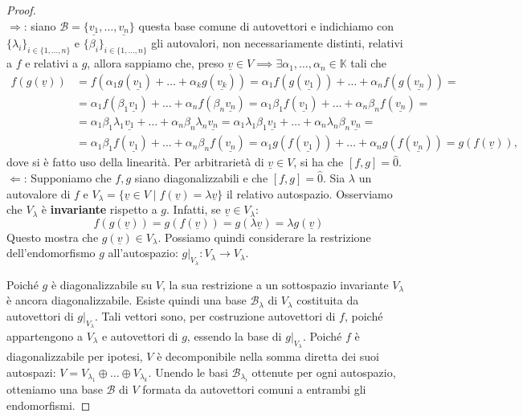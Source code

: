 \begin{proof} \hspace{1cm} \\
    $\boxed{\Rightarrow}$: siano $\mathcal{B} = \{ \underline{v_1}, \ldots, \underline{v_n} \}$ questa base comune di autovettori e indichiamo con $\{ \lambda_i \}_{i \in \{ 1, \ldots, n \}}$ e $\{ \beta_i \}_{i \in \{ 1, \ldots, n\}}$ gli autovalori, non necessariamente distinti, relativi a $f$ e relativi a $g$, allora sappiamo che, preso $\underline{v} \in V \implies \exists \alpha_1, \ldots, \alpha_n \in \mathbb{K}$ tali che
    \begin{align}
        f(g(\underline{v})) &= f(\alpha_1 g(\underline{v_1}) + \ldots + \alpha_k g(\underline{v_k})) = \alpha_1 f(g(\underline{v_1})) + \ldots + \alpha_n f(g(\underline{v_n})) = \\
        &= \alpha_1 f(\beta_1 \underline{v_1}) + \ldots + \alpha_n f(\beta_n \underline{v_n}) = \alpha_1 \beta_1 f(\underline{v_1}) + \ldots + \alpha_n \beta_n f(\underline{v_n}) = \\
        &= \alpha_1 \beta_1 \lambda_1 \underline{v_1} + \ldots + \alpha_n \beta_n \lambda_n \underline{v_n} = \alpha_1 \lambda_1 \beta_1 \underline{v_1} + \ldots + \alpha_n \lambda_n \beta_n \underline{v_n} = \\
        &= \alpha_1 \beta_1 f(\underline{v_1}) + \ldots + \alpha_n \beta_n f(\underline{v_n}) = \alpha_1 g(f(\underline{v_1})) + \ldots + \alpha_n g(f(\underline{v_n})) = g(f(\underline{v})),
    \end{align}
    dove si è fatto uso della linearità. Per arbitrarietà di $\underline{v} \in V$, si ha che $[f, g] = \hat{0}$. \\

    $\boxed{\Leftarrow}$: Supponiamo che $f, g$ siano diagonalizzabili e che $[f, g] = \hat{0}$.
    Sia $\lambda$ un autovalore di $f$ e $V_\lambda = \{ \underline{v} \in V \mid f(\underline{v}) = \lambda \underline{v} \}$ il relativo autospazio. Osserviamo che $V_\lambda$ è \textbf{invariante} rispetto a $g$. Infatti, se $\underline{v} \in V_\lambda$:
    \begin{equation}
    f(g(\underline{v})) = g(f(\underline{v})) = g(\lambda \underline{v}) = \lambda g(\underline{v})
    \end{equation}
    Questo mostra che $g(\underline{v}) \in V_\lambda$. Possiamo quindi considerare la restrizione dell'endomorfismo $g$ all'autospazio: $g|_{V_\lambda}: V_\lambda \to V_\lambda$.

    Poiché $g$ è diagonalizzabile su $V$, la sua restrizione a un sottospazio invariante $V_\lambda$ è ancora diagonalizzabile. Esiste quindi una base $\mathcal{B}_\lambda$ di $V_\lambda$ costituita da autovettori di $g|_{V_\lambda}$.
    Tali vettori sono, per costruzione autovettori di $f$, poiché appartengono a $V_\lambda$ e autovettori di $g$, essendo la base di $g|_{V_\lambda}$.
    Poiché $f$ è diagonalizzabile per ipotesi, $V$ è decomponibile nella somma diretta dei suoi autospazi: $V = V_{\lambda_1} \oplus \dots \oplus V_{\lambda_k}$. Unendo le basi $\mathcal{B}_{\lambda_i}$ ottenute per ogni autospazio, otteniamo una base $\mathcal{B}$ di $V$ formata da autovettori comuni a entrambi gli endomorfismi.
\end{proof}

